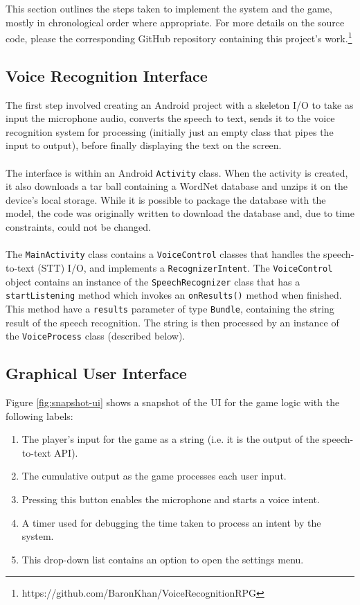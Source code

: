 \documentclass[11pt]{article}
\begin{document}
This section outlines the steps taken to implement the system and the game, mostly in chronological order where appropriate. For more details on the source code, please the corresponding GitHub repository containing this project's work.\footnote{https://github.com/BaronKhan/VoiceRecognitionRPG}

\subsection{Voice Recognition Interface}

The first step involved creating an Android project with a skeleton I/O to take as input the microphone audio, converts the speech to text, sends it to the voice recognition system for processing (initially just an empty class that pipes the input to output), before finally displaying the text on the screen.
\\
\\
The interface is within an Android \texttt{Activity} class. When the activity is created, it also downloads a tar ball containing a WordNet database and unzips it on the device's local storage. While it is possible to package the database with the model, the code was originally written to download the database and, due to time constraints, could not be changed.
\\
\\
The \texttt{MainActivity} class contains a \texttt{VoiceControl} classes that  handles the speech-to-text (STT) I/O, and implements a \texttt{RecognizerIntent}. The \texttt{VoiceControl} object contains an instance of the \texttt{SpeechRecognizer} class that has a \texttt{startListening} method which invokes an \texttt{onResults()} method when finished. This method have a \texttt{results} parameter of type \texttt{Bundle}, containing the string result of the speech recognition. The string is then processed by an instance of the \texttt{VoiceProcess} class (described below).

\subsection{Graphical User Interface}

Figure \ref{fig:snapshot-ui} shows a snapshot of the UI for the game logic with the following labels:

\begin{enumerate}
	\item The player's input for the game as a string (i.e. it is the output of the speech-to-text API).
	\item The cumulative output as the game processes each user input.
	\item Pressing this button enables the microphone and starts a voice intent.
	\item A timer used for debugging the time taken to process an intent by the system.
	\item This drop-down list contains an option to open the settings menu.
\end{enumerate}
\end{document}
